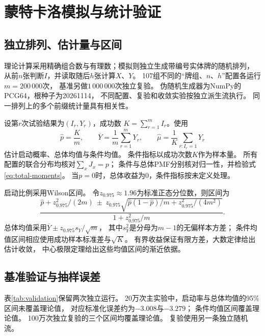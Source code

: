 \section{蒙特卡洛模拟与统计验证}\label{sec:simulation}
\subsection{独立排列、估计量与区间}
理论计算采用精确组合数与有理数；模拟则独立生成带编号实体牌的随机排列，
从前$n$张判断$I$，并读取随后$h$张计算$X$、$Y$。
107组不同的“牌组、$n$、$h$”配置各运行$m=200\,000$次，
基准另做$1\,000\,000$次独立复验。
伪随机生成器为NumPy的PCG64，根种子为20261114，
不同配置、复验和收敛实验按独立派生流执行。
同一排列上的多个前缀统计量具有相关性。

设第$r$次试验结果为$(I_r,Y_r)$，成功数
$K=\sum_{r=1}^m I_r$。使用
\begin{equation}\label{eq:estimators}
\widehat p=\frac Km,\qquad
\overline Y=\frac1m\sum_{r=1}^mY_r,\qquad
\widehat\mu=\frac1K\sum_{r:I_r=1}Y_r
\end{equation}
估计启动概率、总体均值与条件均值。
条件指标以成功次数$K$作为样本量。
所有配置的联合分布均核对$\sum_xJ_x=p$；
条件与总体PMF分别核对归一性，并检验式\eqref{eq:total-moments}。
当$p=0$时，总体收益为0，条件指标按未定义处理。

启动比例采用Wilson区间\cite{wilson}。
令$z_{0.975}\approx1.96$为标准正态分位数，则区间为
\begin{equation}\label{eq:wilson}
\frac{\widehat p+z_{0.975}^2/(2m)
\ \pm\ z_{0.975}
\sqrt{\widehat p(1-\widehat p)/m+z_{0.975}^2/(4m^2)}}
{1+z_{0.975}^2/m}.
\end{equation}
总体均值采用$\overline Y\pm z_{0.975}s_Y/\sqrt m$，
其中$s_Y^2$是分母为$m-1$的无偏样本方差；
条件均值区间相应使用成功样本标准差与$\sqrt K$。
有界收益保证有限方差，大数定律给出估计收敛，
中心极限定理给出这些均值区间的渐近依据\cite{blitzstein}。

\subsection{基准验证与抽样误差}
表\ref{tab:validation}保留两次独立运行。
20万次主实验中，启动率与总体均值的95\%区间未覆盖理论值，
对应标准化误差约为$-3.008$与$-3.279$；
条件均值区间覆盖理论值。
100万次独立复验的三个区间均覆盖理论值。
复验使用另一条独立随机流。

\begin{table}[htbp]
\centering\small
\caption{基准精确理论与独立排列模拟；概率用Wilson区间，均值用CLT区间}\label{tab:validation}
\setlength{\tabcolsep}{6pt}

\end{table}

